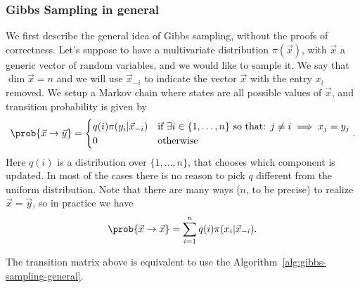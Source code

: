   \subsubsection{Gibbs Sampling in general}
  We first describe the general idea of Gibbs sampling, without the proofs of correctness.
  Let's suppose to have a multivariate distribution \(\pi{(\vec{x})}\), with \(\vec{x}\) a
  generic vector of random variables, and we would like to sample it.
  We say that \(\dim{\vec{x}} = n\) and we will use \(\vec{x}_{-i}\) to indicate the vector
  \(\vec{x}\) with the entry \(x_i\) removed.
  We setup a Markov chain where states are all possible values of \(\vec{x}\), and transition
  probability is given by
  \[
    \prob{\vec{x} \to \vec{y}} = 
      \begin{cases}
        q{(i)} \pi{(y_i|\vec{x}_{-i})} &
          \text{if } \exists i \in \{1,\dots,n\} \text{ so that: } j\neq i \implies x_j = y_j\\
        0 &\text{otherwise}
      \end{cases}.
  \]
  Here \(q{(i)}\) is a distribution over \(\{1,\dots,n\}\), that chooses which component is
  updated. In most of the cases there is no reason to pick \(q\) different from the uniform
  distribution. Note that there are many ways (\(n\), to be precise) to realize \(\vec{x} = \vec{y}\),
  so in practice we have 
  \[
    \prob{\vec{x} \to \vec{x}} = \sum_{i=1}^{n} q{(i)} \pi{(x_i|\vec{x}_{-i})}.
  \]
  
  The transition matrix above is equivalent to use the Algorithm~\ref{alg:gibbs-sampling-general}.
  
